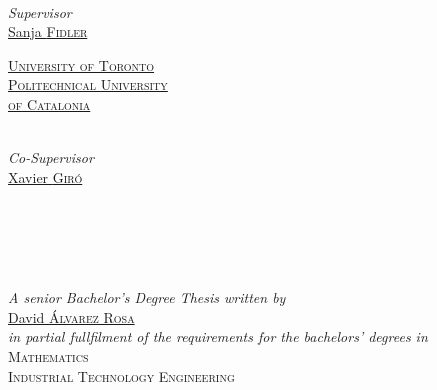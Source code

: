 

\begin{titlepage}
  \makeatletter
  \hypersetup{
    urlcolor = black
  }

  \centering

  \begin{minipage}[c]{.25\textwidth}
    \centering
    \href{https://www.utoronto.ca/}{}\\[1ex]
    \large
    \textsl{Supervisor}\\
    \Large
    \href{https://www.cs.utoronto.ca/~fidler/}{Sanja \textsc{Fidler}}
  \end{minipage}\hfill
  \begin{minipage}[c]{.5\textwidth}
    \scshape\Large
    \centering
    \href{https://www.utoronto.ca/}{University of Toronto} \\[2ex]
    \href{https://www.upc.edu/en}{Politechnical University\\
      of Catalonia}
  \end{minipage}\hfill
  \begin{minipage}[c]{.25\textwidth}
    \centering
    \href{https://www.upc.edu/en}{}\\[1ex]
    \large
    \textsl{Co-Supervisor}\\
    \Large
    \href{https://imatge.upc.edu/web/people/xavier-giro}{Xavier \textsc{Giró}}
  \end{minipage}\\

  \vfill

  \Huge
  \textbf{\href{https://recomprehension.com}{\@title}}\\[-1ex]
  \\

  \vfill

  \large
  \textsl{A senior Bachelor's Degree Thesis written by}\Large\\
  \href{https://david.alvarezrosa.com/}{David \textsc{Álvarez Rosa}}\\[1.5ex]

  \large
  \textsl{in partial fullfilment of the requirements for the bachelors' degrees in}\Large\\
  \textsc{Mathematics}\\
  \textsc{Industrial Technology Engineering}\\[1.5ex]


\end{titlepage}
